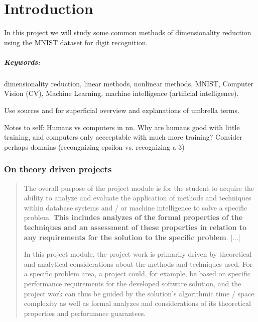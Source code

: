 \chapter{Introduction}\label{cha:introduction}
\noindent
In this project we will study some common methods of dimensionality reduction using the MNIST dataset for digit recognition.

\paragraph{Keywords:} dimensionality reduction, linear methods, nonlinear methods, MNIST, Computer Vision (CV), Machine Learning, machine intelligence (artificial intelligence).

Use sources \cite{IBM-machine-intelligence} and \cite{IBM-computer-vision} for superficial overview and explanations of umbrella terms.

Notes to self: Humans vs computers in \gls{nn}. Why are humans good with little training, and computers only accceptable with much more training? Consider perhaps domains (recongnizing epsilon vs. recognizing a 3)


\subsection*{On theory driven projects}
\blockcquote{Projectmodule}{The overall purpose of the project module is for the student to acquire the ability to analyze and evaluate the application of methods and techniques within database systems and / or machine intelligence to solve a specific problem. \textbf{This includes analyzes of the formal properties of the techniques and an assessment of these properties in relation to any requirements for the solution to the specific problem}. [...]

In this project module, the project work is primarily driven by theoretical and analytical considerations about the methods and techniques used. For a specific problem area, a project could, for example, be based on specific performance requirements for the developed software solution, and the project work can thus be guided by the solution's algorithmic time / space complexity as well as formal analyzes and considerations of its theoretical properties and performance guarantees.}



